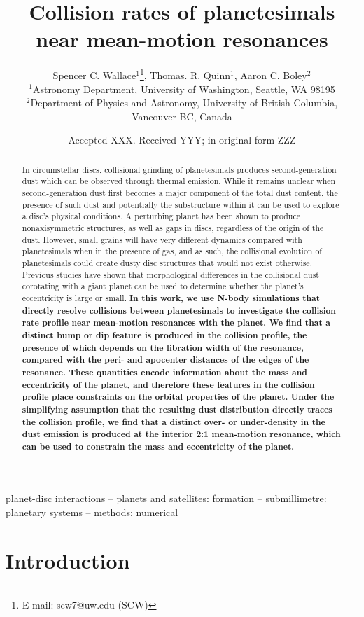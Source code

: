\documentclass[fleqn,usenatbib]{mnras}
\title[Collision rates of planetesimals]{Collision rates of planetesimals near mean-motion resonances}
\author[S. C. Wallace et al.]{
Spencer C. Wallace$^{1}$\thanks{E-mail: scw7@uw.edu (SCW)},
Thomas. R. Quinn$^{1}$,
Aaron C. Boley$^{2}$
\\
$^{1}$Astronomy Department, University of Washington, Seattle, WA 98195\\
$^{2}$Department of Physics and Astronomy, University of British Columbia, Vancouver BC, Canada
}
\date{Accepted XXX. Received YYY; in original form ZZZ}
\begin{document}
\label{firstpage}
\pagerange{\pageref{firstpage}--\pageref{lastpage}}
\maketitle

\begin{abstract}
In circumstellar discs, collisional grinding of planetesimals produces second-generation dust which can be observed through thermal 
emission. While it remains unclear when second-generation dust first becomes a major component of the total dust content, the presence of 
such dust and potentially the substructure within it can be used to explore a disc's physical conditions. A perturbing planet has been shown to 
produce nonaxisymmetric structures, as well as gaps in discs, regardless of the origin of the dust. However, small grains will have very 
different dynamics compared with planetesimals when in the presence of gas, and as such, the collisional evolution of planetesimals could 
create dusty disc structures that would not exist otherwise. Previous studies have shown that morphological differences in the collisional dust 
corotating with a giant planet can be used to determine whether the planet's eccentricity is large or small. \textbf{In this work, we use N-body simulations
that directly resolve collisions between planetesimals to investigate the collision rate profile near mean-motion resonances with the planet. We 
find that a distinct bump or dip feature is produced in the collision profile, the presence of which depends on the libration width of the resonance, 
compared with the peri- and apocenter distances of the edges of the resonance. These quantities encode information about the mass and eccentricity 
of the planet, and therefore these features in the collision profile place constraints on the orbital properties of the planet. Under the simplifying 
assumption that the resulting dust distribution directly traces the collision profile, we find that a distinct over- or under-density in the dust emission 
is produced at the interior 2:1 mean-motion resonance, which can be used to constrain the mass and eccentricity of the planet.}
\end{abstract}

\begin{keywords}
planet-disc interactions -- planets and satellites: formation -- submillimetre: planetary systems -- methods: numerical
\end{keywords}

\section{Introduction} \label{sec:intro}
\end{document}
